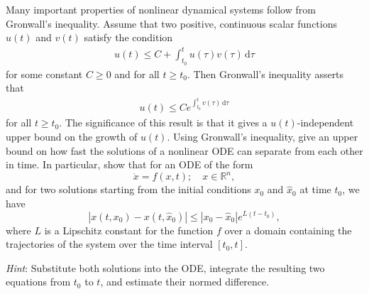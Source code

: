 \begin{exercise}
Many important properties of nonlinear dynamical systems follow from Gronwall's inequality. Assume that two positive, continuous scalar functions $u(t)$ and $v(t)$ satisfy the condition
\begin{align}
	u(t) \leq C + \int_{t_0}^t u(\tau)v(\tau) \, \text{d}\tau
\end{align}
for some constant $C \geq 0$ and for all $t \geq t_0$. Then Gronwall's inequality asserts that
\begin{align}
u(t) \leq Ce^{\int_{t_0}^t v(\tau) \, \text{d}\tau} 
\end{align}
for all $t \geq t_0$. The significance of this result is that it gives a $u(t)$-independent upper bound on the growth of $u(t)$. Using Gronwall's inequality, give an upper bound on how fast the solutions of a nonlinear ODE can separate from each other in time. In particular, show that for an ODE of the form
\begin{equation*}
	\dot{x} = f(x,t); \quad x \in \mathbb{R}^n,
\end{equation*}
and for two solutions starting from the initial conditions $x_0$ and $\hat{x}_0$ at time $t_0$, we have
\begin{equation*}
	|x(t, x_0) - x(t, \hat{x}_0)| \leq |x_0 - \hat{x}_0|e^{L(t - t_0)},
\end{equation*}
where $L$ is a Lipschitz constant for the function $f$ over a domain containing the trajectories of the system over the time interval $[t_0, t]$.

\textit{Hint}: Substitute both solutions into the ODE, integrate the resulting two equations from $t_0$ to $t$, and estimate their normed difference.

\end{exercise}


